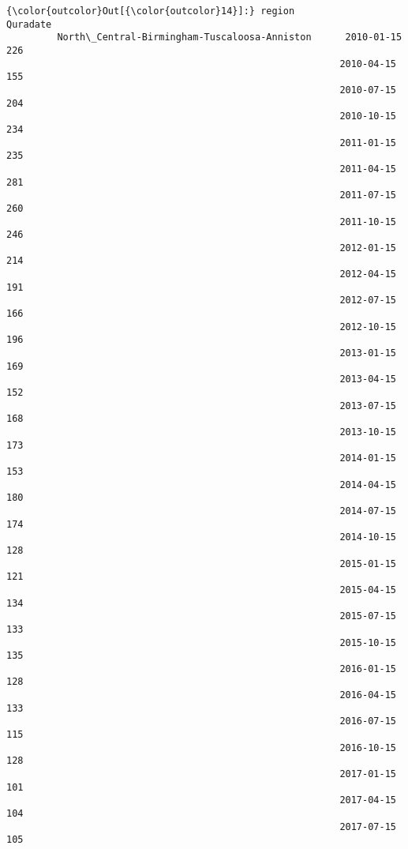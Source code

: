 \documentclass[11pt]{article}
\begin{document}
\begin{Verbatim}[commandchars=\\\{\}]
{\color{outcolor}Out[{\color{outcolor}14}]:} region                                            Quradate  
         North\_Central-Birmingham-Tuscaloosa-Anniston      2010-01-15    226
                                                           2010-04-15    155
                                                           2010-07-15    204
                                                           2010-10-15    234
                                                           2011-01-15    235
                                                           2011-04-15    281
                                                           2011-07-15    260
                                                           2011-10-15    246
                                                           2012-01-15    214
                                                           2012-04-15    191
                                                           2012-07-15    166
                                                           2012-10-15    196
                                                           2013-01-15    169
                                                           2013-04-15    152
                                                           2013-07-15    168
                                                           2013-10-15    173
                                                           2014-01-15    153
                                                           2014-04-15    180
                                                           2014-07-15    174
                                                           2014-10-15    128
                                                           2015-01-15    121
                                                           2015-04-15    134
                                                           2015-07-15    133
                                                           2015-10-15    135
                                                           2016-01-15    128
                                                           2016-04-15    133
                                                           2016-07-15    115
                                                           2016-10-15    128
                                                           2017-01-15    101
                                                           2017-04-15    104
                                                           2017-07-15    105

\end{Verbatim}
\end{document}
